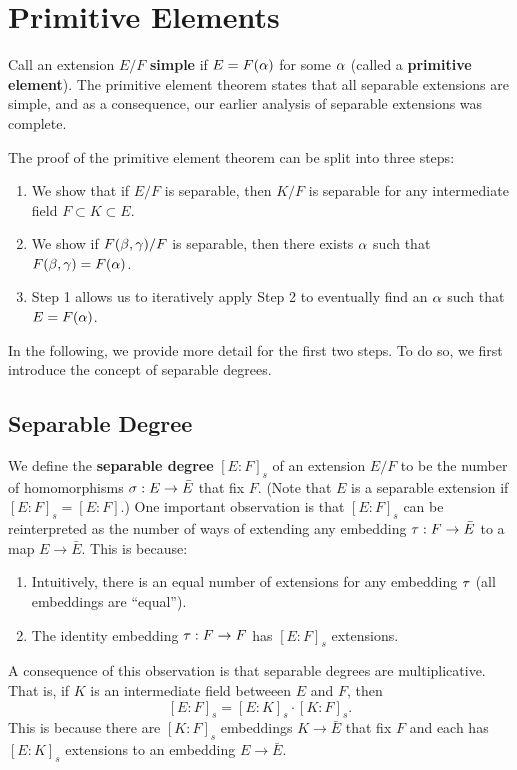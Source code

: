 \section{Primitive Elements}

Call an extension $E/F$ \textbf{simple} if $E = F(\alpha)$ for some $\alpha$ (called a \textbf{primitive element}). The primitive element theorem states that all separable extensions are simple, and as a consequence, our earlier analysis of separable extensions was complete.

The proof of the primitive element theorem can be split into three steps:
\begin{enumerate}
    \item We show that if $E/F$ is separable, then $K/F$ is separable for any intermediate field $F \subset K \subset E$.
    \item We show if $F(\beta, \gamma)/F$ is separable, then there exists $\alpha$ such that $F(\beta, \gamma) = F(\alpha)$.
    \item Step 1 allows us to iteratively apply Step 2 to eventually find an $\alpha$ such that $E = F(\alpha)$.
\end{enumerate}

In the following, we provide more detail for the first two steps. To do so, we first introduce the concept of separable degrees.

\subsection{Separable Degree}
We define the \textbf{separable degree} $[E:F]_s$ of an extension $E/F$ to be the number of homomorphisms $\sigma: E \to \bar{E}$ that fix $F$. (Note that $E$ is a separable extension if $[E:F]_s = [E:F]$.) One important observation is that $[E:F]_s$ can be reinterpreted as the number of ways of extending any embedding $\tau: F \to \bar{E}$ to a map $E \to \bar{E}$. This is because:
\begin{enumerate}
    \item Intuitively, there is an equal number of extensions for any embedding $\tau$ (all embeddings are ``equal'').
    \item The identity embedding $\tau: F \to F$ has $[E:F]_s$ extensions.
\end{enumerate}

A consequence of this observation is that separable degrees are multiplicative. That is, if $K$ is an intermediate field betweeen $E$ and $F$, then
\[
    [E:F]_s = [E:K]_s \cdot [K:F]_s.
\]
This is because there are $[K:F]_s$ embeddings $K \to \bar{E}$ that fix $F$ and each has $[E:K]_s$ extensions to an embedding $E \to \bar{E}$.

